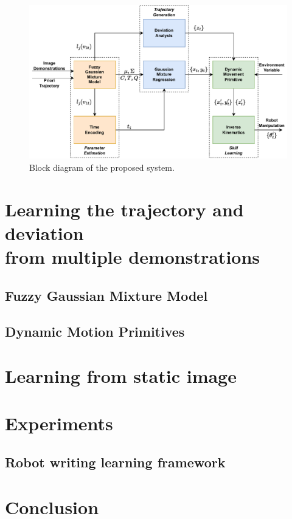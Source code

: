 \documentclass[journal]{IEEEtran}
\begin{document}
\begin{figure}[!t]
    \centering
    \includegraphics[width=6in]{./fig/fig1.pdf}
    \caption{Block diagram of the proposed system.}
    \label{fig1}
 \end{figure}
    

\section{Learning the trajectory and deviation \\from multiple demonstrations}

\subsection{Fuzzy Gaussian Mixture Model}





\subsection{Dynamic Motion Primitives}




\section{Learning from static image}


\section{Experiments}
\subsection{Robot writing learning framework}


\section{Conclusion}





\end{document}
